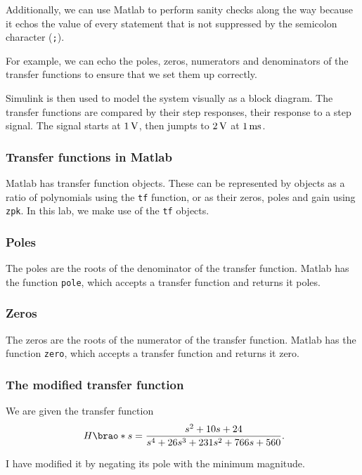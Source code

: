 \documentclass[12pt]{article}
\DeclarePairedDelimiter\brao()%
\begin{document}
Additionally, we can use Matlab to perform sanity checks along the way because it echos the value of every statement that is not suppressed by the semicolon character (\texttt{;}).

For example, we can echo the poles, zeros, numerators and denominators of the transfer functions to ensure that we set them up correctly.

Simulink is then used to model the system visually as a block diagram.
The transfer functions are compared by their step responses, their response to a step signal.
The signal starts at $\SI1\volt$, then jumpts to $\SI2\volt$ at $\SI1{\milli\second}$.

\subsubsection{Transfer functions in Matlab}

Matlab has transfer function objects.
These can be represented by objects as a ratio of polynomials using the \texttt{tf} function,
or as their zeros, poles and gain using \texttt{zpk}.
In this lab, we make use of the \texttt{tf} objects.

\subsubsection{Poles}

The poles are the roots of the denominator of the transfer function.
Matlab has the function \texttt{pole},
which accepts a transfer function and returns it poles.

\subsubsection{Zeros}

The zeros are the roots of the numerator of the transfer function.
Matlab has the function \texttt{zero},
which accepts a transfer function and returns it zero.

\subsubsection{The modified transfer function}

We are given the transfer function
\[
    H\brao*s = \frac{s^2 + 10s + 24}{s^4 + 26s^3 + 231s^2 + 766s + 560}\rlap.
\]

I have modified it by negating its pole with the minimum magnitude.
\end{document}
